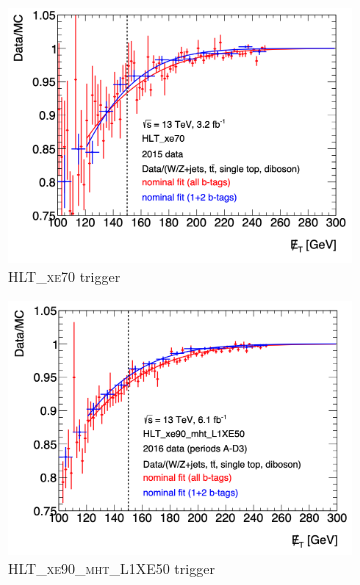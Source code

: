 \begin{figure}[htbp]
  \centering
  \begin{subfigure}{0.49\textwidth}
    \centering
    \includegraphics[width=1.\textwidth]{figures/monoV/monoVtriggersf_HLTxe70.png}
    \caption{\textsc{HLT\_xe70} \met trigger}
  \end{subfigure}
    \begin{subfigure}{0.49\textwidth}
    \centering
    \includegraphics[width=1.\textwidth]{figures/monoV/monoVtriggersf_HLTxe90.png}
    \caption{\textsc{HLT\_xe90\_mht\_L1XE50} \met trigger}
  \end{subfigure}
  \\
  \begin{subfigure}{0.49\textwidth}

\end{subfigure}
\end{figure}
